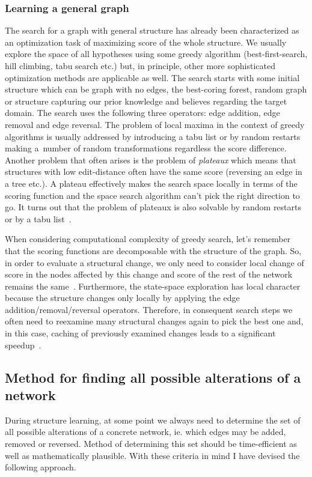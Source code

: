 \documentclass[english,cover]{fitthesis} %
\newcommand{\term}[1]{\emph{#1}}           %
\begin{document}
\subsubsection{Learning a general graph}
The search for a graph with general structure has already been characterized as an optimization task of maximizing score of the whole structure. We usually explore the space of all hypotheses using some greedy algorithm (best-first-search, hill climbing, tabu search etc.) but, in principle, other more sophisticated optimization methods are applicable as well. The search starts with some initial structure which can be graph with no edges, the best-coring forest, random graph or structure capturing our prior knowledge and believes regarding the target domain. The search uses the following three operators: edge addition, edge removal and edge reversal. The problem of local maxima in the context of greedy algorithms is usually addressed by introducing a tabu list or by random restarts making a~number of random transformations regardless the score difference. Another problem that often arises is the problem of \term{plateaux} which means that structures with low edit-distance often have the same score (reversing an edge in a tree etc.). A plateau effectively makes the search space locally  in terms of the scoring function and the space search algorithm can't pick the right direction to go. It turns out that the problem of plateaux is also solvable by random restarts or by a tabu list~\cite[p.~815]{pgm}.

When considering computational complexity of greedy search, let's remember that the scoring functions are decomposable with the structure of the graph. So, in order to evaluate a structural change, we only need to consider local change of score in the nodes affected by this change and score of the rest of the network remains the same~\cite[p.~818]{pgm}. Furthermore, the state-space exploration has local character because the structure changes only locally by applying the edge addition/removal/reversal operators. Therefore, in consequent search steps we often need to reexamine many structural changes again to pick the best one and, in this case, caching of previously examined changes leads to a significant speedup~\cite[p.~819]{pgm}.






\subsection{Method for finding all possible alterations of a network}
During structure learning, at some point we always need to determine the set of all possible alterations of a concrete network, ie. which edges may be added, removed or reversed. Method of determining this set should be time-efficient as well as mathematically plausible. With these criteria in mind I have devised the following approach.
\end{document}
